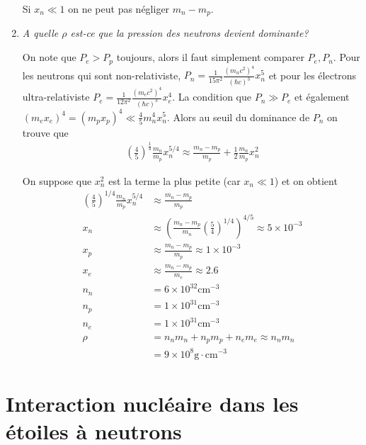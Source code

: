 \documentclass[10pt]{report}
\newcommand{\scinot}[2]{#1\times 10^{#2}}
\begin{document}
\begin{enumerate}[1.]
        Si $x_n \ll 1$ on ne peut pas n\'egliger $m_n - m_p$.

    \item \emph{A quelle $\rho$ est-ce que la pression des neutrons devient dominante?}

        On note que $P_e > P_p$ toujours, alors il faut simplement comparer $P_e, P_n$. Pour les neutrons qui sont non-relativiste, $P_n = \frac{1}{15\pi^2}\frac{(m_nc^2)^4}{(\hbar c)^3}x_n^5$ et pour les \'electrons ultra-relativiste $P_e = \frac{1}{12\pi^2}\frac{(m_ec^2)^4}{(\hbar c)^3}x_e^4$. La condition que $P_n \gg P_e$ et \'egalement $(m_ex_e)^4 = (m_px_p)^4 \ll \frac{4}{5}m_n^4x_n^5$. Alors au seuil du dominance de $P_n$ on trouve que
        \begin{align}
            \left( \frac{4}{5} \right)^{\frac{1}{4}}\frac{m_n}{m_p}x_n^{5/4} \approx \frac{m_n - m_p}{m_p} + \frac{1}{2} \frac{m_n}{m_p}x_n^2
        \end{align}

        On suppose que $x_n^2$ est la terme la plus petite (car $x_n \ll 1$) et on obtient
        \begin{align}
            \left( \frac{4}{5} \right)^{1/4}\frac{m_n}{m_p}x_n^{5/4} &\approx \frac{m_n - m_p}{m_p}\\
            x_n &\approx \left( \frac{m_n - m_p}{m_n}\left( \frac{5}{4} \right)^{1/4} \right)^{4/5} \approx \scinot{5}{-3}\\
            x_p &\approx \frac{m_n - m_p}{m_p} \approx \scinot{1}{-3}\\
            x_e &\approx \frac{m_n - m_p}{m_e} \approx 2.6\\
            n_n &= \scinot{6}{32}\mathrm{cm^{-3}}\\
            n_p &= \scinot{1}{31}\mathrm{cm^{-3}}\\
            n_e &= \scinot{1}{31}\mathrm{cm^{-3}}\\
            \rho &= n_nm_n + n_pm_p + n_em_e \approx n_nm_n\\
            &= \scinot{9}{8}\mathrm{g\cdot cm^{-3}}
        \end{align}
\end{enumerate}

\section{Interaction nucl\'eaire dans les \'etoiles \`a neutrons}
\end{document}
